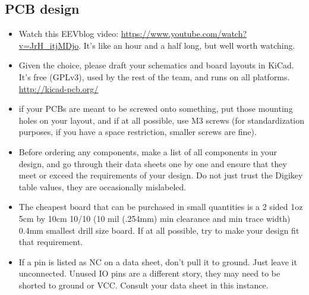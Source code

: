 \documentclass{article}
\begin{document}
\subsection{PCB design}
\begin{itemize}
\item Watch this EEVblog video: \url{https://www.youtube.com/watch?v=JrH_itjMDjo}. It's like an hour and a half long, but well worth watching.
\item Given the choice, please draft your schematics and board layouts in KiCad. It's free (GPLv3), used by the rest of the team, and runs on all platforms. \url{http://kicad-pcb.org/}
\item if your PCBs are meant to be screwed onto something, put those mounting holes on your layout, and if at all possible, use M3 screws (for standardization purposes, if you have a space restriction, smaller screws are fine).
\item Before ordering any components, make a list of all components in your design, and go through their data sheets one by one and ensure that they meet or exceed the requirements of your design. Do not just trust the Digikey table values, they are occasionally mislabeled.
\item The cheapest board that can be purchased in small quantities is a 2 sided 1oz 5cm by 10cm 10/10 (10 mil (.254mm) min clearance and min trace width) 0.4mm smallest drill size board. If at all possible, try to make your design fit that requirement.
\item If a pin is listed as NC on a data sheet, don't pull it to ground. Just leave it unconnected. Unused IO pins are a different story, they may need to be shorted to ground or VCC. Consult your data sheet in this instance.


\end{itemize}
\end{document}

